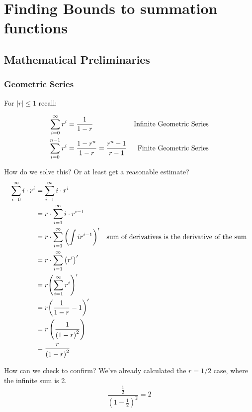 \documentclass[english, 10pt]{article}
\begin{document}
\section{Finding Bounds to summation functions}
\subsection{Mathematical Preliminaries}
\subsubsection{Geometric Series}
For $\left|r\right| \le1$ recall:

\begin{align*}
    \sum_{i=0}^{\infty}r^{i} &= \frac{1}{1-r} & \text{Infinite Geometric Series}\\
    \sum_{i=0}^{n-1}r^{i} &= \frac{1-r^{n}}{1-r} = \frac{r^n -1}{r-1} & \text{Finite Geometric Series}\\
\end{align*}

How do we solve this? Or at least get a reasonable estimate?
\begin{align*}
    \sum_{i=0}^{\infty}i\cdot r^{i} &= \sum_{i=1}^{\infty}i\cdot r^{i} \\
    &= r\cdot\sum_{i=1}^{\infty}i\cdot r^{i-1} \\
    &= r\cdot\sum_{i=1}^{\infty}{\left( \int ir^{i-1} \right)}^{\prime} & \text{sum of derivatives is the derivative of the sum}\\
    &= r\cdot\sum_{i=1}^{\infty}{\left( r^i \right)}^{\prime} \\
    &= r{\left(\sum_{i=1}^{\infty} r^i \right)}^{\prime} \\
    &= r{\left( \frac{1}{1-r}-1 \right)}^{\prime} \\
    &= r\left( \frac{1}{{\left( 1-r \right)}^{2}} \right) \\
    &= \frac{r}{{\left( 1-r \right)}^2}
\end{align*}

How can we check to confirm? We've already calculated the $r=1/2$ case, where the infinite sum is 2.
$$ \frac{\frac{1}{2}}{{\left( 1-\frac{1}{2} \right)}^2} =2$$
\end{document}
